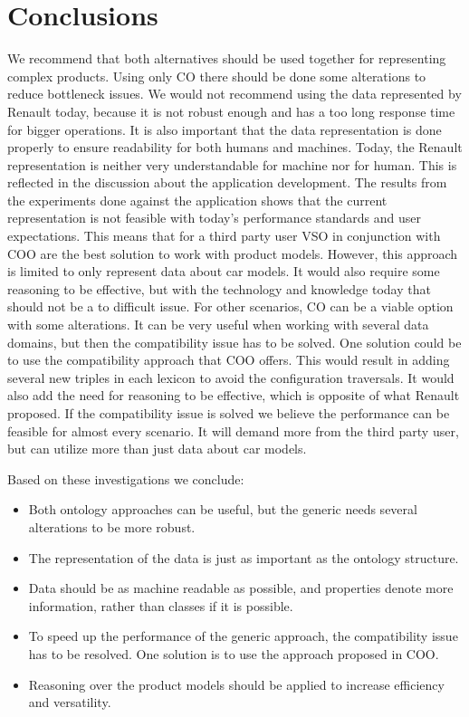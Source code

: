 \documentclass{llncs}
\begin{document}
\section{Conclusions}

We recommend that both alternatives should be used together for
representing complex products. 
Using only CO there should be done some alterations to reduce
bottleneck issues. We would not recommend using the data represented
by Renault today, because it is not robust enough and has a too long
response time for bigger operations.  It is also important that the
data representation is done properly to ensure readability for both
humans and machines.  Today, the Renault representation is neither
very understandable for machine nor for human. This is reflected in
the discussion about the application development.  The results from
the experiments done against the application shows that the current
representation is not feasible with today's performance standards and
user expectations. This means that for a third party user VSO
in conjunction with COO are the best solution to work with product
models. However, this approach is limited to only represent data about
car models. It would also require some reasoning to be effective, but
with the technology and knowledge today that should not be a to
difficult issue. For other scenarios, CO can be a viable option with 
some alterations. It can be very useful when working with several
data domains, but then the compatibility issue has to be solved.  One
solution could be to use the compatibility approach that COO
offers. This would result in adding several new triples in each
lexicon to avoid the configuration traversals.  It would also add the
need for reasoning to be effective, which is opposite of what Renault
proposed. If the compatibility issue is solved we believe the
performance can be feasible for almost every scenario. It will demand
more from the third party user, but can utilize more than just data
about car models. 

Based on these investigations we conclude:
\begin{itemize}
 \item Both ontology approaches can be useful, but the generic needs several alterations to be more robust.
 \item The representation of the data is just as important as the ontology structure.
 \item Data should be as machine readable as possible, and properties denote more information, rather than classes if it is possible.
 \item To speed up the performance of the generic approach, the compatibility issue has to be resolved. One solution is to use the approach proposed in COO.
 \item Reasoning over the product models should be applied to increase efficiency and versatility.
\end{itemize}


%
%
%

\end{document}
